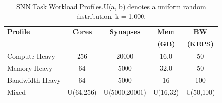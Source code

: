 \begin{table}[h!]
  \centering
  \small
  \setlength{\tabcolsep}{4pt}
  \caption{SNN Task Workload Profiles.U(a, b) denotes a uniform random distribution. k = 1,000.}
  \label{tab:workload_spec}
  \begin{tabular}{@{}lcccc@{}}
    \toprule
    \textbf{Profile} & \textbf{Cores} & \textbf{Synapses} & \textbf{Mem} & \textbf{BW} \\
     & & & \textbf{(GB)} & \textbf{(KEPS)} \\
    \midrule
    Compute-Heavy    & 256            & 20000           & 16.0        & 50   \\
    Memory-Heavy     & 64             & 5000           & 32.0        & 50     \\
    Bandwidth-Heavy  & 64             & 5000            & 16         & 100    \\
    Mixed            & U(64,256)      & U(5000,20000)        & U(16,32)      & U(50,100) \\
    \bottomrule
  \end{tabular}%
\end{table}